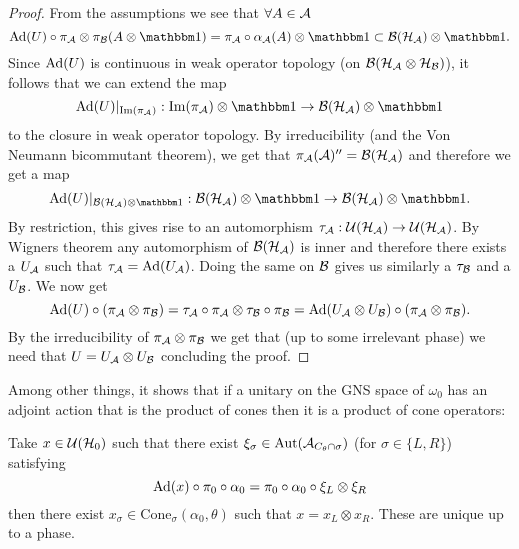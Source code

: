 \documentclass[11pt,a4paper,twoside]{article}
\numberwithin{equation}{section}
\begin{document}
	\begin{proof}
		From the assumptions we see that $\forall A\in\AA$
		\begin{equation}
			\Ad{U}\circ\pi_\AA\otimes\pi_\BB(A\otimes\id)=\pi_\AA\circ\alpha_\AA(A)\otimes\id\subset \BB(\HH_\AA)\otimes\id.
		\end{equation}
		Since $\Ad{U}$ is continuous in weak operator topology (on $\BB(\HH_{\AA}\otimes\HH_{\BB})$), it follows that we can extend the map
		\begin{equation}
			\Ad{U}|_{\textrm{Im}(\pi_\AA)}:\textrm{Im}(\pi_\AA)\otimes\id\rightarrow \BB(\HH_\AA)\otimes\id
		\end{equation}
		to the closure in weak operator topology. By irreducibility (and the Von Neumann bicommutant theorem), we get that $\pi_\AA(\AA)''=\BB(\HH_\AA)$ and therefore we get a map
		\begin{equation}
			\Ad{U}|_{\BB(\HH_\AA)\otimes\id}:\BB(\HH_\AA)\otimes\id\rightarrow \BB(\HH_\AA)\otimes\id.
		\end{equation}
		By restriction, this gives rise to an automorphism $\tau_\AA:\UU(\HH_\AA)\rightarrow\UU(\HH_\AA)$. By Wigners theorem any automorphism of $\BB(\HH_\AA)$ is inner and therefore there exists a $U_\AA$ such that $\tau_\AA=\Ad{U_\AA}$. Doing the same on $\BB$ gives us similarly a $\tau_\BB$ and a $U_\BB$. We now get
		\begin{equation}
			\Ad{U}\circ(\pi_\AA\otimes\pi_\BB)=\tau_\AA\circ\pi_\AA\otimes\tau_\BB\circ\pi_\BB=\Ad{U_\AA\otimes U_\BB}\circ(\pi_\AA\otimes\pi_\BB).
		\end{equation}
		By the irreducibility of $\pi_\AA\otimes\pi_\BB$ we get that (up to some irrelevant phase) we need that $U=U_\AA\otimes U_\BB$ concluding the proof.
	\end{proof}
	Among other things, it shows that if a unitary on the GNS space of $\omega_0$ has an adjoint action that is the product of cones then it is a product of cone operators:
	\begin{lemma}\label{lem:UsingIrreducibilityAndWignerTheorem}
		Take $x\in\UU(\HH_0)$ such that there exist $\xi_\sigma\in\Aut{\AA_{C_\theta\cap\sigma}}$ (for $\sigma\in\{L,R\}$) satisfying
		\begin{equation}
			\Ad{x}\circ\pi_0\circ\alpha_0=\pi_0\circ\alpha_0\circ\xi_L\otimes\xi_R
		\end{equation}
		then there exist $x_\sigma\in\textrm{Cone}_\sigma(\alpha_0,\theta)$ such that $x=x_L\otimes x_R$. These are unique up to a phase.
	\end{lemma}
\end{document}
